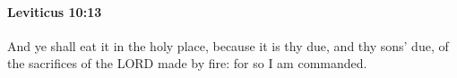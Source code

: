 
		\paragraph{Leviticus 10:13} %
			\label{LEVITICUS-10-13}

			And ye shall eat it in the holy place, because it is thy due, and thy sons’ due, of the sacrifices of the LORD made by fire: for so I am commanded.


